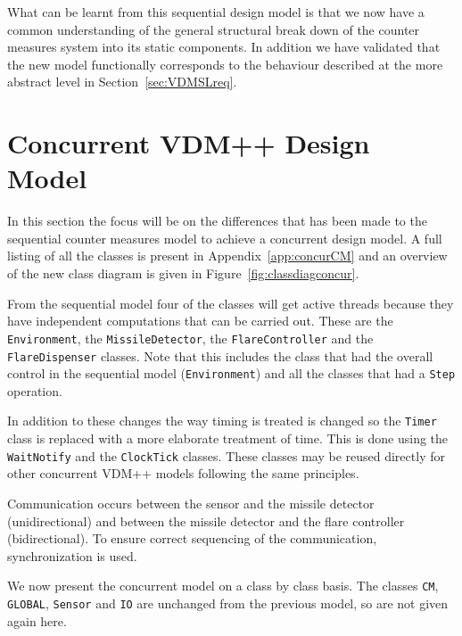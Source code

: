 \documentclass{overturerepchap}
\begin{document}
What can be learnt from this sequential design model is
that we now have a common understanding of the general structural
break down of the counter measures system into its static
components. In addition we have validated that the new model
functionally corresponds to the behaviour described at the more
abstract level in Section~\ref{sec:VDMSLreq}. 

\section{Concurrent VDM++ Design Model}\label{sec:concurmod}

In this section the focus will be on the differences that has been
made to the sequential counter measures model to achieve a concurrent
design model. A full listing of all the classes is present in 
Appendix~\ref{app:concurCM} and an overview of the new class diagram
is given in Figure~\ref{fig:classdiagconcur}.

From the sequential model four of the classes will get active threads
because they have independent computations that can be carried
out. These are the \texttt{Environment}, the
\texttt{MissileDetector}, the \texttt{FlareController} and the
\texttt{FlareDispenser} classes. Note that this includes the class 
that had the overall control in the sequential model (\texttt{Environment}) 
and all the classes that had a \texttt{Step} operation.

In addition to these changes the way timing is treated is changed so
the \texttt{Timer} class is replaced with a more elaborate treatment
of time. This is done using the
\texttt{WaitNotify} and the \texttt{ClockTick} classes. These classes
may be reused directly for other concurrent VDM++ models following the
same principles.

Communication occurs between the sensor and the missile detector
(unidirectional) and between the missile detector and the flare
controller (bidirectional). To ensure correct sequencing of the
communication, synchronization is used.

We now present the concurrent model on a class by class basis. The
classes \texttt{CM}, \texttt{GLOBAL}, \texttt{Sensor} and \texttt{IO} 
are unchanged from the
previous model, so are not given again here.
\end{document}
